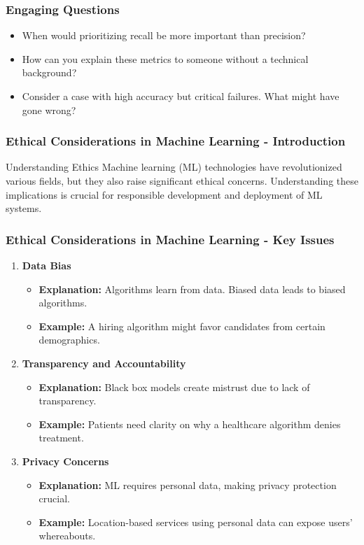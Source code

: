 \documentclass[aspectratio=169]{beamer}
\begin{document}
\begin{frame}[fragile]
    \frametitle{Engaging Questions}
    \begin{itemize}
        \item When would prioritizing recall be more important than precision?
        \item How can you explain these metrics to someone without a technical background?
        \item Consider a case with high accuracy but critical failures. What might have gone wrong?
    \end{itemize}
\end{frame}

\begin{frame}[fragile]
    \frametitle{Ethical Considerations in Machine Learning - Introduction}
    \begin{block}{Understanding Ethics}
        Machine learning (ML) technologies have revolutionized various fields, but they also raise significant ethical concerns. Understanding these implications is crucial for responsible development and deployment of ML systems.
    \end{block}
\end{frame}

\begin{frame}[fragile]
    \frametitle{Ethical Considerations in Machine Learning - Key Issues}
    \begin{enumerate}
        \item \textbf{Data Bias}
        \begin{itemize}
            \item \textbf{Explanation:} Algorithms learn from data. Biased data leads to biased algorithms.
            \item \textbf{Example:} A hiring algorithm might favor candidates from certain demographics.
        \end{itemize}
        
        \item \textbf{Transparency and Accountability}
        \begin{itemize}
            \item \textbf{Explanation:} Black box models create mistrust due to lack of transparency.
            \item \textbf{Example:} Patients need clarity on why a healthcare algorithm denies treatment.
        \end{itemize}
        
        \item \textbf{Privacy Concerns}
        \begin{itemize}
            \item \textbf{Explanation:} ML requires personal data, making privacy protection crucial.
            \item \textbf{Example:} Location-based services using personal data can expose users' whereabouts.
        \end{itemize}
    \end{enumerate}
\end{frame}
\end{document}

